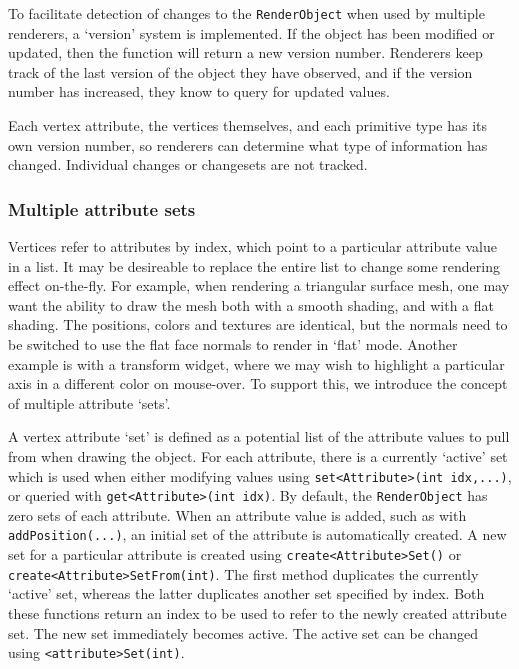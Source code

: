 \documentclass{article}
\begin{document}
To facilitate detection of changes to the \lstinline{RenderObject} when used by multiple
renderers, a `version' system is implemented.  If the object has been modified or updated,
then the function  will return a new version number.  
Renderers keep track of the last version of the object they have observed, and if the version
number has increased, they know to query for updated values.

Each vertex attribute, the vertices themselves, and each primitive type has its own version
number, so renderers can determine what type of information has changed.  Individual changes
or changesets are not tracked.

\subsubsection{Multiple attribute sets}

Vertices refer to attributes by index, which point to a particular attribute value in a list.
It may be desireable to replace the entire list to change some rendering effect
on-the-fly.  For example, when rendering a triangular surface mesh, one may want the ability
to draw the mesh both with a smooth shading, and with a flat shading.  The positions, colors
and textures are identical, but the normals need to be switched to use the flat face normals
to render in `flat' mode.  Another example is with a transform widget, where we may wish to 
highlight a particular axis in a different color on mouse-over.  To support
this, we introduce the concept of multiple attribute `sets'.

A vertex attribute `set' is defined as a potential list of the attribute values to pull from
when drawing the object.  For each attribute, there is a currently `active' set which is
used when either modifying values using \lstinline{set<Attribute>(int idx,...)}, or queried
with \lstinline{get<Attribute>(int idx)}.  By default, the \lstinline{RenderObject} has zero 
sets of each attribute.  When an attribute value is added, such as with \lstinline{addPosition(...)},
an initial set of the attribute is automatically created.  A new set for a particular
attribute is created using \lstinline{create<Attribute>Set()} or 
\lstinline{create<Attribute>SetFrom(int)}.  The first method duplicates the currently
`active' set, whereas the latter duplicates another set specified by index.
Both these functions return an index to be used to refer to the newly created
attribute set.  The new set immediately becomes active.  The active set can be changed using
\lstinline{<attribute>Set(int)}.
\end{document}
